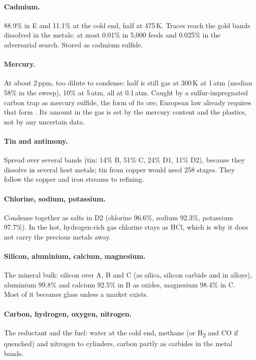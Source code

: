 \documentclass[11pt,a4paper]{article}
\begin{document}
\paragraph{Cadmium.} 88.9\% in E and 11.1\% at the cold end, half at 475\,K. Traces reach the gold bands dissolved in the metals: at most 0.01\% in 5,000 feeds and 0.025\% in the adversarial search. Stored as cadmium sulfide.

\paragraph{Mercury.} At about 2\,ppm, too dilute to condense: half is still gas at 300\,K at 1\,atm (median 58\% in the sweep), 10\% at 5\,atm, all at 0.1\,atm. Caught by a sulfur-impregnated carbon trap as mercury sulfide, the form of its ore; European law already requires that form \citep{eu2017mercury}. Its amount in the gas is set by the mercury content and the plastics, not by any uncertain data.

\paragraph{Tin and antimony.} Spread over several bands (tin: 14\% B, 51\% C, 24\% D1, 11\% D2), because they dissolve in several host metals; tin from copper would need 258 stages. They follow the copper and iron streams to refining.

\paragraph{Chlorine, sodium, potassium.} Condense together as salts in D2 (chlorine 96.6\%, sodium 92.3\%, potassium 97.7\%). In the hot, hydrogen-rich gas chlorine stays as HCl, which is why it does not carry the precious metals away.

\paragraph{Silicon, aluminium, calcium, magnesium.} The mineral bulk: silicon over A, B and C (as silica, silicon carbide and in alloys), aluminium 99.8\% and calcium 92.5\% in B as oxides, magnesium 98.4\% in C. Most of it becomes glass unless a market exists.

\paragraph{Carbon, hydrogen, oxygen, nitrogen.} The reductant and the fuel: water at the cold end, methane (or H\textsubscript{2} and CO if quenched) and nitrogen to cylinders, carbon partly as carbides in the metal bands.
\end{document}
